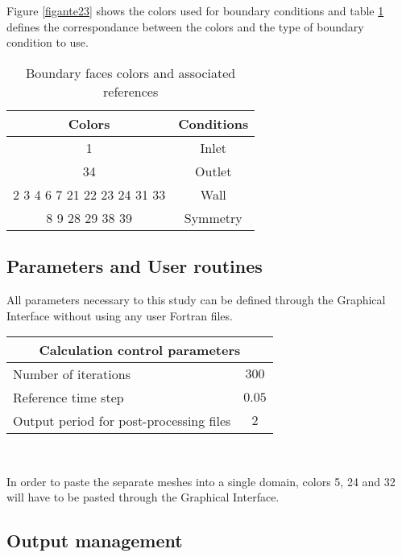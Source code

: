 Figure \ref{figante23} shows the colors used for boundary conditions and
table \ref{tabante21} defines the correspondance between the colors and
the type of boundary condition to use.

\begin{table}[htp]
\begin{center}
\begin{tabular}{|c|c|}
\hline
Colors & Conditions \\
\hline
1 & Inlet \\
\hline
34 & Outlet \\
\hline
2 3 4 6 7 21 22 23 24 31 33 & Wall \\
\hline
8 9 28 29 38 39 & Symmetry \\
\hline
\end{tabular}
\caption{Boundary faces colors and associated references}
\label{tabante21}
\end{center}
\end{table}


        \subsection{Parameters and User routines}

All parameters necessary to this study can be defined through the Graphical
Interface without using any user Fortran files.

\begin{center}
\begin{tabular}{|l|c|}
\hline
\multicolumn{2}{|c|}{Calculation control parameters} \\
\hline
Number of iterations & $300$ \\
\hline
Reference time step & $0.05$ \\
\hline
Output period for post-processing files& $2$ \\
\hline
\end{tabular}\\
\end{center}

In order to paste the separate meshes into a single domain, colors 5, 24 and 32
will have to be pasted through the Graphical Interface.



        \subsection{Output management}

